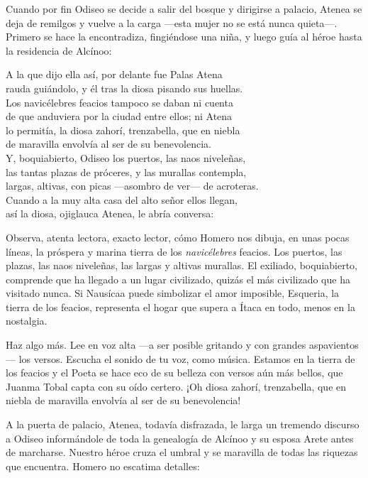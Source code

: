 \label{cap:esqueria}

Cuando por fin Odiseo se decide a salir del bosque y dirigirse a palacio, Atenea se deja de remilgos y vuelve a la carga ---esta mujer no se está nunca quieta---. Primero se hace la encontradiza, fingiéndose una niña, y luego guía al héroe hasta la residencia de Alcínoo:

\begin{versocita}
A la que dijo ella así, por delante fue Palas Atena\\
rauda guiándolo, y él tras la diosa pisando sus huellas.\\
Los navicélebres feacios tampoco se daban ni cuenta\\
de que anduviera por la ciudad entre ellos; ni Atena\\
lo permitía, la diosa zahorí, trenzabella, que en niebla\\
de maravilla envolvía al ser de su benevolencia.\\
Y, boquiabierto, Odiseo los puertos, las naos niveleñas,\\
las tantas plazas de próceres, y las murallas contempla,\\
largas, altivas, con picas ---asombro de ver--- de acroteras.\\
Cuando a la muy alta casa del alto señor ellos llegan,\\
así la diosa, ojiglauca Atenea, le abría conversa:
\end{versocita}

Observa, atenta lectora, exacto lector, cómo Homero nos dibuja, en unas pocas líneas, la próspera y marina tierra de los \emph{navicélebres} feacios. Los puertos, las plazas, las naos niveleñas, las largas y altivas murallas. El exiliado, boquiabierto, comprende que ha llegado a un lugar civilizado, quizás el más civilizado que ha visitado nunca. Si Nausícaa puede simbolizar el amor imposible, Esqueria, la tierra de los feacios, representa el hogar que supera a Ítaca en todo, menos en la nostalgia.

Haz algo más. Lee en voz alta ---a ser posible gritando y con grandes aspavientos--- los versos. Escucha el sonido de tu voz, como música. Estamos en la tierra de los feacios y el Poeta se hace eco de su belleza con versos aún más bellos, que Juanma Tobal capta con su oído certero. ¡Oh diosa zahorí, trenzabella, que en niebla
de maravilla envolvía al ser de su benevolencia!

A la puerta de palacio, Atenea, todavía disfrazada, le larga un tremendo discurso a Odiseo informándole de toda la genealogía de Alcínoo y su esposa Arete antes de marcharse. Nuestro héroe cruza el umbral y se maravilla de todas las riquezas que encuentra. Homero no escatima detalles:

